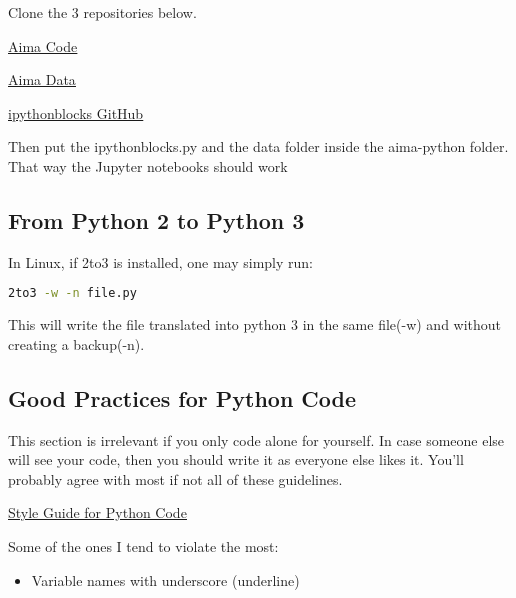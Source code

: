 Clone the 3 repositories below.

\href{https://github.com/aimacode/aima-python}{\ul{Aima Code}}

\href{https://github.com/aimacode/aima-data/tree/f6cbea61ad0c21c6b7be826d17af5a8d3a7c2c86}{\ul{Aima Data}}

\href{https://github.com/jiffyclub/ipythonblocks/blob/master/ipythonblocks/ipythonblocks.py}{\ul{ipythonblocks GitHub}}

Then put the ipythonblocks.py and the data folder inside the aima-python folder. That way the Jupyter notebooks should work

\subsection{From Python 2 to Python 3}
In Linux, if 2to3 is installed, one may simply run:
\begin{lstlisting}[language=bash]
    2to3 -w -n file.py    
\end{lstlisting}
This will write the file translated into python 3 in the same file(-w) and without creating a backup(-n).


\subsection{Good Practices for Python Code}

This section is irrelevant if you only code alone for yourself. In case someone else will see your code, then you should write it as everyone else likes it. You'll probably agree with most if not all of these guidelines.

\href{https://www.python.org/dev/peps/pep-0008/}{\ul{Style Guide for Python Code}}

Some of the ones I tend to violate the most:
\begin{itemize}
    \item Variable names with underscore (underline)
\end{itemize}
